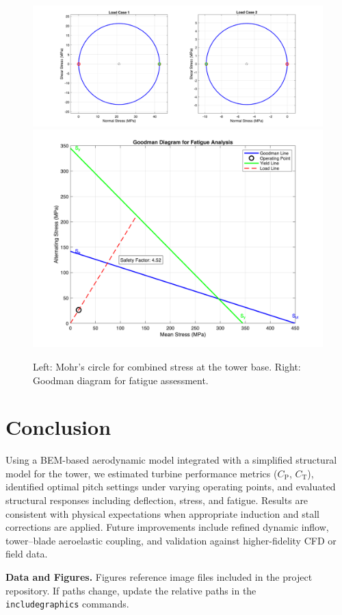 \documentclass[11pt]{article}
\begin{document}
\begin{figure}[h]
  \centering
  \includegraphics[width=0.48\linewidth]{../../PNGS/Mohr_Circle_Analysis.png}\hfill
  \includegraphics[width=0.48\linewidth]{../../PNGS/Goodman_Diagram_Analysis.png}
  \caption{Left: Mohr's circle for combined stress at the tower base. Right: Goodman diagram for fatigue assessment.}
  \label{fig:tower_mohr_goodman}
\end{figure}

\section{Conclusion}
Using a BEM-based aerodynamic model integrated with a simplified structural model for the tower, we estimated turbine performance metrics (\(C_\mathrm{P}\), \(C_\mathrm{T}\)), identified optimal pitch settings under varying operating points, and evaluated structural responses including deflection, stress, and fatigue. Results are consistent with physical expectations when appropriate induction and stall corrections are applied. Future improvements include refined dynamic inflow, tower--blade aeroelastic coupling, and validation against higher-fidelity CFD or field data.

\vspace{1em}
\noindent\textbf{Data and Figures.} Figures reference image files included in the project repository. If paths change, update the relative paths in the \texttt{\\includegraphics} commands.
\end{document}
